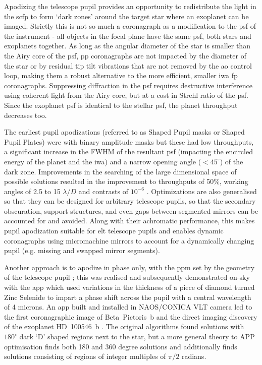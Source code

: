 \documentclass[letterpaper]{ar-1col}
\newcommand{\ld}{$\lambda/D$}
\newcommand{\acc}[1]{\entry{\acs{#1}}{\acl{#1}}}
\begin{document}
Apodizing the telescope pupil provides an opportunity to redistribute the light in the \ac{scfp} to form `dark zones' around the target star where an exoplanet can be imaged.
%
Strictly this is not so much a coronagraph as a modification to the \ac{psf} of the instrument - all objects in the focal plane have the same \ac{psf}, both stars and exoplanets together.
%
As long as the angular diameter of the star is smaller than the Airy core of the \ac{psf}, \ac{pp} coronagraphs are not impacted by the diameter of the star or by residual tip tilt vibrations that are not removed by the \ac{ao} control loop, making them a robust alternative to the more efficient, smaller \ac{iwa} \ac{fp} coronagraphs. 
%
Suppressing diffraction in the \ac{psf} requires destructive interference using coherent light from the Airy core, but at a cost in Strehl ratio of the \ac{psf}.
%
Since the exoplanet \ac{psf} is identical to the stellar \ac{psf}, the planet throughput decreases too.

The earliest pupil apodizations (referred to as Shaped Pupil masks or Shaped Pupil Plates) were with binary amplitude masks \citep{Jacquinot64,Kasdin05} but these had low throughputs, a significant increase in the FWHM of the resultant \ac{psf} (impacting the encircled energy of the planet and the \ac{iwa}) and a narrow opening angle ($<45^\circ$) of the dark zone.
% 
Improvements in the searching of the large dimensional space of possible solutions resulted in the improvement to throughputs of 50\%, working angles of 2.5 to 15 \ld{} and contrasts of $10^{-6}$ \citep{Carlotti11}.
%
Optimizations are also generalised so that they can be designed for arbitrary telescope pupils, so that the secondary obscuration, support structures, and even gaps between segmented mirrors can be accounted for and avoided.
%
Along with their achromatic performance, this makes pupil apodization suitable for \ac{elt} telescope pupils and enables dynamic coronagraphs using micromachine mirrors \citep{Leboulleux22b,Carlotti23} to account for a dynamically changing pupil (e.g. missing and swapped mirror segments).

\begin{armarginnote}[]
\acc{spp}
\acc{app}
\acc{gvapp}
\acc{vvc}
\end{armarginnote}

Another approach is to apodize in phase only, with the \ac{ppm} set by the geometry of the telescope pupil \citep{Codona04}; this was realised and subsequently demonstrated on-sky with the \acl{app} \citep[\acs{app}; ][]{Kenworthy07} which used variations in the thickness of a piece of diamond turned Zinc Selenide to impart a phase shift across the pupil with a central wavelength of 4 microns.
%
An \ac{app} built and installed in NAOS/CONICA VLT camera \citep{Kenworthy10} led to the first coronagraphic image of Beta~Pictoris~b \citep{Quanz10} and the direct imaging discovery of the exoplanet HD~100546~b \citep{Quanz13}.
%
The original algorithms found solutions with $180^\circ$ dark `D' shaped regions next to the star, but a more general theory to APP optimisation \citep{Por17} finds both 180 and 360 degree solutions and additionally finds solutions consisting of regions of integer multiples of $\pi/2$ radians.
\end{document}
